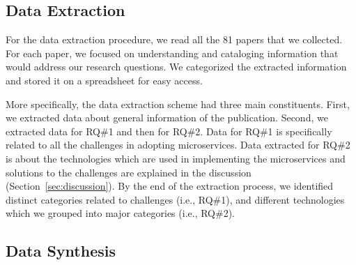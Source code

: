 \subsection{Data Extraction}


For the data extraction procedure, we read all the 81 papers that we collected. For each paper, we focused on understanding and cataloging information that would address our research questions. We categorized the extracted information and stored it on a spreadsheet for easy access. 

More specifically, the data extraction scheme had three main constituents. First, we extracted data about general information of the publication. Second, we extracted data for RQ\#1 and then for RQ\#2. Data for RQ\#1 is specifically related to all the challenges in adopting microservices. Data extracted for RQ\#2 is about the technologies which are used in implementing the microservices and solutions to the challenges are explained in the discussion (Section~\ref{sec:discussion}).
%
By the end of the extraction process, we identified \challengecount distinct categories related to challenges (i.e., RQ\#1), and \techcount different technologies which we grouped into \techgroupcount major categories (i.e., RQ\#2). 


\subsection{Data Synthesis}

